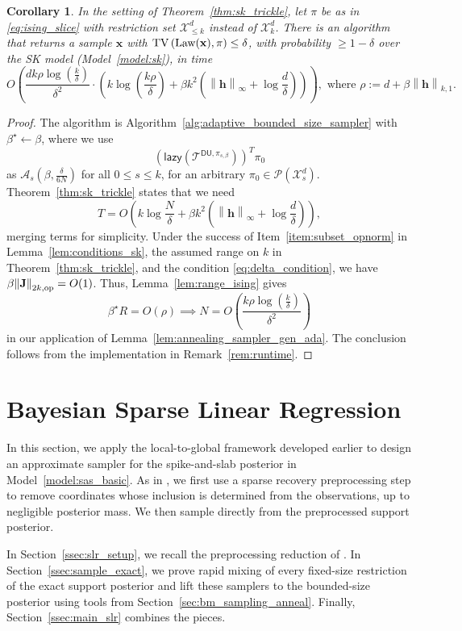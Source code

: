\documentclass[11pt]{article}
\newtheorem{corollary}{Corollary}
\newcommand{\defeq}{:=}
\newcommand{\norm}[1]{\left\lVert#1\right\rVert}
\newcommand{\1}{\mathbf{1}}
\newcommand{\0}{\mathbf{0}}
\newcommand{\Par}[1]{\left(#1\right)}
\newcommand{\TV}[1]{\mathrm{TV}\left(#1\right)}
\newcommand{\lazy}{\mathsf{lazy}}
\newcommand{\Law}{\textup{Law}}
\newcommand{\mj}{{\mathbf{J}}}
\newcommand{\normkop}[2]{{\left\lVert#1\right\rVert_{#2, \textup{op}}}}
\newcommand{\vh}{{\mathbf{h}}}
\newcommand{\vx}{{\mathbf{x}}}
\newcommand{\calA}{{\mathcal{A}}}
\newcommand{\calP}{{\mathcal{P}}}
\newcommand{\calT}{{\mathcal{T}}}
\newcommand{\calX}{{\mathcal{X}}}
\newcommand{\TDU}[1]{\calT^{\mathsf{DU}, #1}}
\begin{document}
\begin{corollary}\label{cor:fast_mixing_sparse_set_dobrushin_gen}
In the setting of Theorem~\ref{thm:sk_trickle}, let $\pi$ be as in \eqref{eq:ising_slice} with restriction set $\calX^d_{\le k}$ instead of $\calX^d_k$. There is an algorithm that returns a sample $\vx$ with
$\TV{\Law(\vx), \pi} \le \delta$, with probability $\ge 1 - \delta$ over the SK model (Model~\ref{model:sk}),
in time
\[O\Par{\frac{dk\rho\log\Par{\frac k \delta}}{\delta^2} \cdot \Par{k \log \Par{\frac{k\rho}{\delta}} + \beta k^2\Par{\norm{\vh}_\infty + \log \frac d \delta}}}, \text{ where } \rho \defeq d + \beta\norm{\vh}_{k, 1}.\]
\end{corollary}
\begin{proof}
The algorithm is Algorithm~\ref{alg:adaptive_bounded_size_sampler} with $\beta^\star \gets \beta$, where we use
\[\Par{\lazy\Par{\TDU{\pi_{s, \beta}}}}^T \pi_0 \]
as $\calA_s(\beta, \frac \delta {6N})$ for all $0 \le s \le k$, for an arbitrary $\pi_0 \in \calP(\calX^d_s)$. Theorem~\ref{thm:sk_trickle} states that we need
\[T = O\Par{k\log \frac N \delta +  \beta k^2\Par{\norm{\vh}_\infty + \log \frac d \delta}},\]
merging terms for simplicity. Under the success of Item~\ref{item:subset_opnorm} in Lemma~\ref{lem:conditions_sk}, the assumed range on $k$ in Theorem~\ref{thm:sk_trickle}, and the condition \eqref{eq:delta_condition}, we have $\beta\normkop{\mj}{2k} = O(1)$. Thus,
Lemma~\ref{lem:range_ising} gives 
\[\beta^\star R = O(\rho) \implies N = O\Par{\frac{k\rho\log\Par{\frac{k}{\delta}}}{\delta^2}}\]
in our application of Lemma~\ref{lem:annealing_sampler_gen_ada}. The conclusion follows from the implementation in Remark~\ref{rem:runtime}.
\end{proof}
\section{Bayesian Sparse Linear Regression}\label{sec:slr}
In this section, we apply the local-to-global framework developed earlier to design an approximate sampler for the spike-and-slab posterior in Model~\ref{model:sas_basic}.  As in \cite{KumarSTZ25}, we first use a sparse recovery preprocessing step to remove coordinates whose inclusion is determined from the observations, up to negligible posterior mass.  We then sample directly from the preprocessed support posterior.

In Section~\ref{ssec:slr_setup}, we recall the preprocessing reduction of \cite{KumarSTZ25}.  In Section~\ref{ssec:sample_exact}, we prove rapid mixing of every fixed-size restriction of the exact support posterior and lift these samplers to the bounded-size posterior using tools from Section~\ref{sec:bm_sampling_anneal}.  Finally, Section~\ref{ssec:main_slr} combines the pieces.
\end{document}
